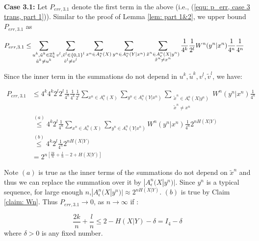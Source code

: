\textbf{Case 3.1:}
Let $P_{err, 3.1}$ denote the first term in the above (i.e., (\ref{equ: p_err, case 3 trans, part 1})). Similar to the proof of Lemma \ref{lem: part 1&2}, we upper bound $P_{err, 3.1}$ as

\begin{align*}
P_{err, 3.1}\leq& \sum_{\substack{u^k, \tilde{u}^k \in \mathbb{Z}_4^k\\ \tilde{u}^k \neq u^k}} \sum_{\substack{v^l, \tilde{v}^l \in \{0, 1\}^l\\ \tilde{v}^l \neq v^l}}   \sum_{x^n\in A_\epsilon^n(X)} \sum_{y^n\in A_\epsilon^n(Y|x^n)}\sum_{\substack{\tilde{x}^n\in A_\epsilon^n(X|y^n) \\ \tilde{x}^n\neq x^n}}  \frac{1}{4^k} \frac{1}{2^l} W^n(y^n|x^n) \frac{1}{4^n}\frac{1}{4^n}
\end{align*}



Since the inner term in the summations do not depend in $u^k,\tilde{u}^k, v^l, \tilde{v}^l$, we have:

\begin{align*}
P_{err, 3.1}&\leq 4^k 4^k 2^l2^l \frac{1}{4^n}  \frac{1}{4^k} \frac{1}{2^l}  \sum_{x^n\in A_\epsilon^n(X)} \sum_{y^n\in A_\epsilon^n(Y|x^n)}\sum_{\substack{\tilde{x}^n\in A_\epsilon^n(X|y^n) \\ \tilde{x}^n\neq x^n}}  W^n(y^n|x^n) \frac{1}{4^n} \\
&\overset{(a)}{\leq} 4^k 2^l\frac{1}{4^n}   \sum_{x^n\in A_\epsilon^n(X)} \sum_{y^n\in A_\epsilon^n(Y|x^n)} W^n(y^n|x^n) \frac{1}{4^n} 2^{nH(X|Y)}\\
&\overset{(b)}{\leq} 4^k 2^l\frac{1}{4^n} 2^{nH(X|Y)}\\
&= 2^{n[\frac{2k}{n}+\frac{l}{n}-2+H(X|Y)]}
\end{align*}

Note $(a)$ is true as the inner terms of the summations do not depend on $\tilde{x}^n$ and thus we can replace the summation over it by $|A_\epsilon^n(X|y^n)|$. Since $y^n$ is a typical sequence, for large enough $n$,$|A_\epsilon^n(X|y^n)|\approx 2^{nH(X|Y)}$. $(b)$ is true by Claim \ref{claim: Wn}.   
Thus $P_{err, 3.1}\rightarrow 0$, as $n\rightarrow \infty$ if :

\begin{equation} \label{equ: case 3.1, bound on l,k}
\frac{2k}{n}+\frac{l}{n}\leq 2-H(X|Y)-\delta = I_4-\delta
\end{equation}
where $\delta >0$ is any fixed number.



